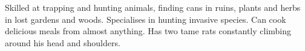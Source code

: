\begin{npcBox}[title=Gutenberg - a Lost trapper and cook]
    \begin{stressSection}
    \end{stressSection}
    \begin{tabularx}{\textwidth}{ XX }
    \end{tabularx}

    \begin{consequences}
    \item {}
    \item {}
    \item {}
    \end{consequences}

    \begin{npcDescription}
    Skilled at trapping and hunting animals, finding cans in ruins, plants and herbs in lost gardens and woods. Specialises in hunting invasive species. Can cook delicious meals from almost anything.
    Has two tame rats constantly climbing around his head and shoulders.
    \end{npcDescription}

\end{npcBox}


